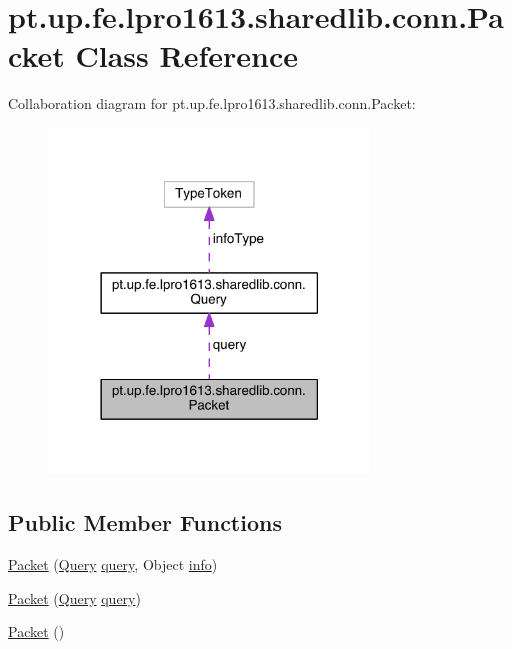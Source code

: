 \hypertarget{classpt_1_1up_1_1fe_1_1lpro1613_1_1sharedlib_1_1conn_1_1_packet}{}\section{pt.\+up.\+fe.\+lpro1613.\+sharedlib.\+conn.\+Packet Class Reference}
\label{classpt_1_1up_1_1fe_1_1lpro1613_1_1sharedlib_1_1conn_1_1_packet}


Collaboration diagram for pt.\+up.\+fe.\+lpro1613.\+sharedlib.\+conn.\+Packet\+:
\nopagebreak
\begin{figure}[H]
\begin{center}
\leavevmode
\includegraphics[width=242pt]{classpt_1_1up_1_1fe_1_1lpro1613_1_1sharedlib_1_1conn_1_1_packet__coll__graph}
\end{center}
\end{figure}
\subsection*{Public Member Functions}
\begin{DoxyCompactItemize}
\item 
\hyperlink{classpt_1_1up_1_1fe_1_1lpro1613_1_1sharedlib_1_1conn_1_1_packet_aeae6b0942efe9aff4aa95a95bdbd89a0}{Packet} (\hyperlink{enumpt_1_1up_1_1fe_1_1lpro1613_1_1sharedlib_1_1conn_1_1_query}{Query} \hyperlink{classpt_1_1up_1_1fe_1_1lpro1613_1_1sharedlib_1_1conn_1_1_packet_acdc36b134a4d54ae9d3358264584864b}{query}, Object \hyperlink{classpt_1_1up_1_1fe_1_1lpro1613_1_1sharedlib_1_1conn_1_1_packet_aa45162e897c5b5a34e4d6c4632cbc096}{info})
\item 
\hyperlink{classpt_1_1up_1_1fe_1_1lpro1613_1_1sharedlib_1_1conn_1_1_packet_a84cf92efe772ec2576fe319cee43effc}{Packet} (\hyperlink{enumpt_1_1up_1_1fe_1_1lpro1613_1_1sharedlib_1_1conn_1_1_query}{Query} \hyperlink{classpt_1_1up_1_1fe_1_1lpro1613_1_1sharedlib_1_1conn_1_1_packet_acdc36b134a4d54ae9d3358264584864b}{query})
\item 
\hyperlink{classpt_1_1up_1_1fe_1_1lpro1613_1_1sharedlib_1_1conn_1_1_packet_af3d893f2e45e4ac0e216a2893e36b2b4}{Packet} ()
\end{DoxyCompactItemize}
